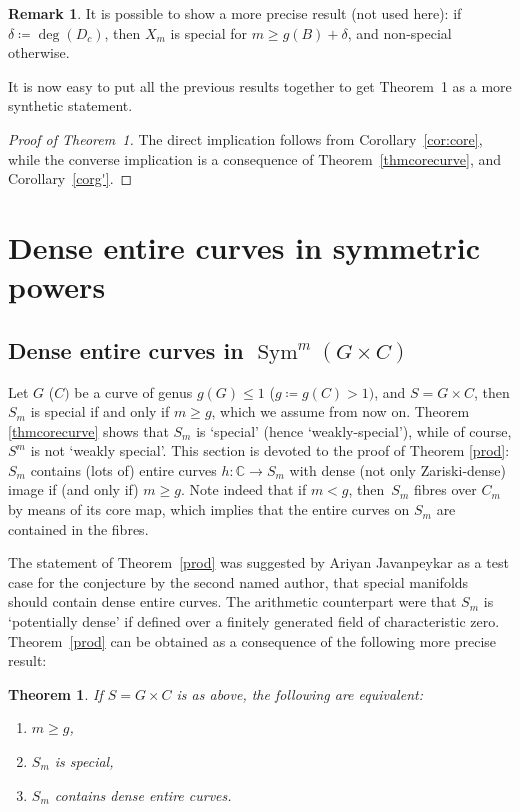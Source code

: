 \documentclass[JEP,XML,SOM,Unicode, NoEqCountersInSection,NoFloatCountersInSection,published]{cedram}
\DeclareMathOperator{\Sym}{Sym}
\theoremstyle{theorem}
\newtheorem{theorem}{Theorem}
\theoremstyle{definition}
\newtheorem{remark}[proposition]{Remark}
\def\bC{{\mathbb C}}
\begin{document}
\begin{remark} It is possible to show a more precise result (not used here): if $\delta\coloneqq \deg(D_c)$, then $X_{m}$ is special for $m\geq g(B)+\delta$, and non-special otherwise.
\end{remark}

It is now easy to put all the previous results together to get Theorem~1 as a more synthetic statement.

\begin{proof}[Proof of Theorem~1]
The direct implication follows from Corollary~\ref{cor:core}, while the converse implication is a consequence of Theorem~\ref{thmcorecurve}, and Corollary~\ref{corg'}.
\end{proof}

\section{Dense entire curves in symmetric powers} \label{sec:denseentirecurves}

\subsection{Dense entire curves in $\Sym^m(G\times C)$}

Let $G$ (\resp $C)$ be a curve of genus $g(G)\leq 1$ (\resp $g\coloneqq g(C)>1)$, and $S=G\times C$, then $S_m$ is special if and only if $m\geq g$, which we assume from now on.
Theorem \ref{thmcorecurve} shows that $S_m$ is `special' (hence `weakly-special'), while of course, $S^m$ is not `weakly special'.
This section is devoted to the proof of Theorem \ref{prod}: $S_m$ contains (lots of) entire curves $h:\bC\to S_m$ with dense (not only Zariski-dense) image if (and only if) $m\geq g$. Note indeed that if $m<g$, then~$S_m$ fibres over $C_m$ by means of its core map, which implies that the entire curves on $S_m$ are contained in the fibres.

The statement of Theorem~\ref{prod} was suggested by Ariyan Javanpeykar as a test case for the conjecture by the second named author, that special manifolds should contain dense entire curves. The arithmetic counterpart were that $S_m$ is `potentially dense' if defined over a finitely generated field of characteristic zero. Theorem~\ref{prod} can be obtained as a consequence of the following more precise result:

\begin{theorem} \label{thm:GCentirecurves} If $S=G\times C$ is as above, the following are equivalent:
\begin{enumerate}
\item
$m\geq g$,

\item
$S_m$ is special,

\item
$S_m$ contains dense entire curves.
\end{enumerate}
\end{theorem}
\end{document}
